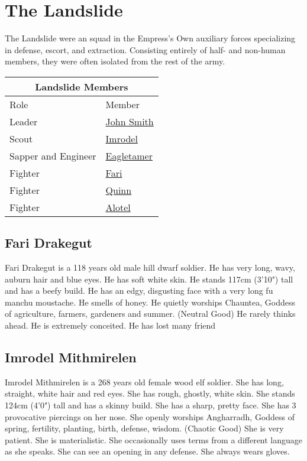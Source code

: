 \section{The Landslide}

The Landslide were an squad in the Empress's Own auxiliary forces specializing in defense, escort,
  and extraction.
Consisting entirely of half- and non-human members, they were often isolated from the rest of the
  army.

\bigskip
\begin{center}
  \begin{tabular}{|l|l|}
    \hline
    \multicolumn{2}{|c|}{Landslide Members}\\
    \hline
    Role & Member \\
    \hline
    Leader & \hyperref[sec:beez]{John Smith} \\
    Scout & \hyperref[subsec:imrodel]{Imrodel} \\
    Sapper and Engineer & \hyperref[subsec:eagletamer]{Eagletamer} \\
    Fighter & \hyperref[subsec:fari]{Fari} \\
    Fighter & \hyperref[subsec:quinn]{Quinn} \\
    Fighter & \hyperref[subsec:alotel]{Alotel} \\
    \hline
  \end{tabular}
\end{center}


\subsection{Fari Drakegut}\label{subsec:fari}
Fari Drakegut is a 118 years old male hill dwarf soldier.
He has very long, wavy, auburn hair and blue eyes.
He has soft white skin.
He stands 117cm (3'10") tall and has a beefy build.
He has an edgy, disgusting face with a very long fu manchu moustache.
He smells of honey.
He quietly worships Chauntea, Goddess of agriculture, farmers, gardeners and summer. (Neutral Good)
He rarely thinks ahead.
He is extremely conceited.
He has lost many friend

\subsection{Imrodel Mithmirelen}\label{subsec:imrodel}
Imrodel Mithmirelen is a 268 years old female wood elf soldier.
She has long, straight, white hair and red eyes.
She has rough, ghostly, white skin.
She stands 124cm (4'0") tall and has a skinny build.
She has a sharp, pretty face.
She has 3 provocative piercings on her nose.
She openly worships Angharradh, Goddess of spring, fertility, planting, birth, defense, wisdom. (Chaotic Good)
She is very patient.
She is materialistic.
She occasionally uses terms from a different language as she speaks.
She can see an opening in any defense.
She always wears gloves.

